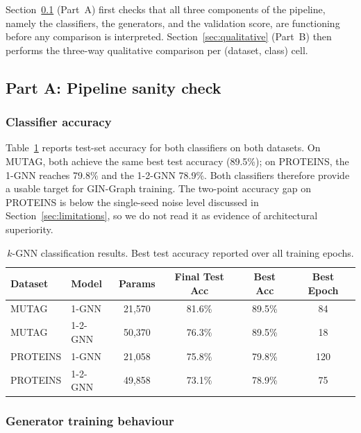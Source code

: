 \documentclass[12pt,a4paper]{article}
\begin{document}
Section~\ref{sec:sanity} (Part~A) first checks that all three components of the pipeline, namely the classifiers, the generators, and the validation score, are functioning before any comparison is interpreted. Section~\ref{sec:qualitative} (Part~B) then performs the three-way qualitative comparison per (dataset, class) cell.

\subsection{Part A: Pipeline sanity check}
\label{sec:sanity}

\subsubsection{Classifier accuracy}

Table~\ref{tab:kgnn-results} reports test-set accuracy for both classifiers on both datasets. On MUTAG, both achieve the same best test accuracy (89.5\%); on PROTEINS, the 1-GNN reaches 79.8\% and the 1-2-GNN 78.9\%. Both classifiers therefore provide a usable target for GIN-Graph training. The two-point accuracy gap on PROTEINS is below the single-seed noise level discussed in Section~\ref{sec:limitations}, so we do not read it as evidence of architectural superiority.

\begin{table}[htbp]
\centering
\caption{$k$-GNN classification results. Best test accuracy reported over all training epochs.}
\label{tab:kgnn-results}
\begin{tabular}{llcccc}
\toprule
\textbf{Dataset} & \textbf{Model} & \textbf{Params} & \textbf{Final Test Acc} & \textbf{Best Acc} & \textbf{Best Epoch} \\
\midrule
MUTAG    & 1-GNN   & 21{,}570 & 81.6\% & 89.5\% & 84 \\
MUTAG    & 1-2-GNN & 50{,}370 & 76.3\% & 89.5\% & 18 \\
\midrule
PROTEINS & 1-GNN   & 21{,}058 & 75.8\% & 79.8\% & 120 \\
PROTEINS & 1-2-GNN & 49{,}858 & 73.1\% & 78.9\% & 75 \\
\bottomrule
\end{tabular}
\end{table}

\subsubsection{Generator training behaviour}
\end{document}
